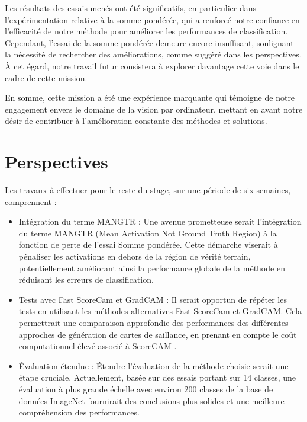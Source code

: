 \documentclass{report}
\begin{document}
{\hspace{1.6cm}Les résultats des essais menés ont été significatifs, en particulier dans l'expérimentation relative à la somme pondérée, qui a renforcé notre confiance en l'efficacité de notre méthode pour améliorer les performances de classification. Cependant, l'essai de la somme pondérée demeure encore insuffisant, soulignant la nécessité de rechercher des améliorations, comme suggéré dans les perspectives. À cet égard, notre travail futur consistera à explorer davantage cette voie dans le cadre de cette mission.
\vspace*{0.5\baselineskip}

\hspace{1.6cm}En somme, cette mission a été une expérience marquante qui témoigne de notre engagement envers le domaine de la vision par ordinateur, mettant en avant notre désir de contribuer à l'amélioration constante des méthodes et solutions.

 

\chapter{Perspectives}

Les travaux à effectuer pour le reste du stage, sur une période de six semaines, comprennent :
\begin{itemize}
    \item Intégration du terme MANGTR : Une avenue prometteuse serait l'intégration du terme MANGTR (Mean Activation Not Ground Truth Region) à la fonction de perte de l'essai Somme pondérée. Cette démarche viserait à pénaliser les activations en dehors de la région de vérité terrain, potentiellement améliorant ainsi la performance globale de la méthode en réduisant les erreurs de classification.

    \item Tests avec Fast ScoreCam \cite{li2023fimf} et GradCAM\cite{Selvaraju_2017_ICCV} : Il serait opportun de répéter les tests en utilisant les méthodes alternatives Fast ScoreCam et GradCAM. Cela permettrait une comparaison approfondie des performances des différentes approches de génération de cartes de saillance, en prenant en compte le coût computationnel élevé associé à ScoreCAM \cite{Wang_2020_CVPR_Workshops}.

    \item Évaluation étendue : Étendre l'évaluation de la méthode choisie serait une étape cruciale. Actuellement, basée sur des essais portant sur 14 classes, une évaluation à plus grande échelle avec environ 200 classes de la base de données ImageNet fournirait des conclusions plus solides et une meilleure compréhension des performances.
\end{itemize}

}
\end{document}
